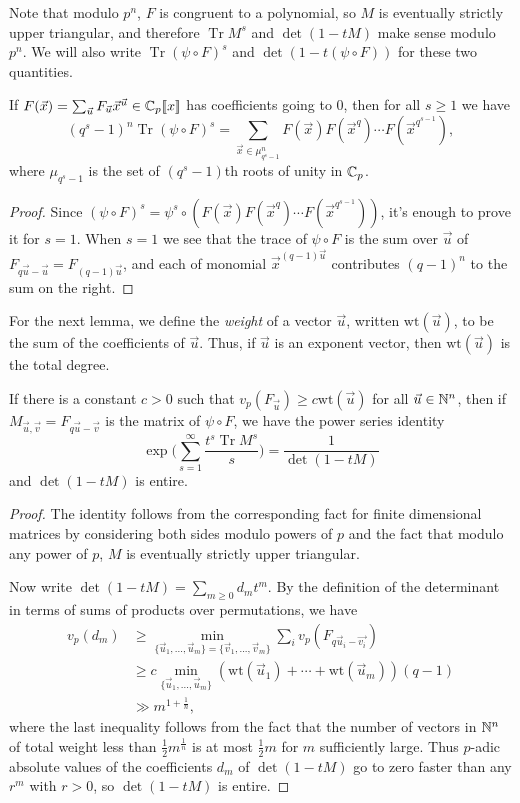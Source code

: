 \documentclass[letterpaper,11pt]{article}
\DeclareMathOperator{\Tr}{Tr}
\begin{document}
Note that modulo $p^n$, $F$ is congruent to a polynomial, so $M$ is eventually strictly upper triangular, and therefore $\Tr M^s$ and $\det(1-tM)$ make sense modulo $p^n$. We will also write $\Tr (\psi \circ F)^s$ and $\det(1-t(\psi\circ F))$ for these two quantities.

\begin{lem} If $F(\vec{x}) = \sum_{\vec{u}} F_{\vec{u}} \vec{x}^{\vec{u}} \in \mathbb{C}_p[\![x]\!]$ has coefficients going to $0$, then for all $s \ge 1$ we have
\[
(q^s-1)^n \Tr (\psi \circ F)^s = \sum_{\vec{x} \in \mu_{q^s-1}^n} F(\vec{x})F(\vec{x}^q) \cdots F(\vec{x}^{q^{s-1}}),
\]
where $\mu_{q^s-1}$ is the set of $(q^s-1)$th roots of unity in $\mathbb{C}_p$.
\end{lem}
\begin{proof} Since $(\psi\circ F)^s = \psi^s \circ (F(\vec{x})F(\vec{x}^q)\cdots F(\vec{x}^{q^{s-1}}))$, it's enough to prove it for $s = 1$. When $s = 1$ we see that the trace of $\psi\circ F$ is the sum over $\vec{u}$ of $F_{q\vec{u}-\vec{u}} = F_{(q-1)\vec{u}}$, and each of monomial $\vec{x}^{(q-1)\vec{u}}$ contributes $(q-1)^n$ to the sum on the right.
\end{proof}

For the next lemma, we define the \emph{weight} of a vector $\vec{u}$, written $\mbox{wt}(\vec{u})$, to be the sum of the coefficients of $\vec{u}$. Thus, if $\vec{u}$ is an exponent vector, then $\mbox{wt}(\vec{u})$ is the total degree.

\begin{lem} If there is a constant $c > 0$ such that $v_p(F_{\vec{u}}) \ge c\mbox{wt}(\vec{u})$ for all $\vec{u} \in \mathbb{N}^n$, then if $M_{\vec{u},\vec{v}} = F_{q\vec{u}-\vec{v}}$ is the matrix of $\psi\circ F$, we have the power series identity
\[
\exp\Bigg(\sum_{s=1}^{\infty} \frac{t^s\Tr M^s}{s}\Bigg) = \frac{1}{\det(1-tM)}
\]
and $\det(1-tM)$ is entire.
\end{lem}
\begin{proof} The identity follows from the corresponding fact for finite dimensional matrices by considering both sides modulo powers of $p$ and the fact that modulo any power of $p$, $M$ is eventually strictly upper triangular.

Now write $\det(1-tM) = \sum_{m\ge 0} d_mt^m$. By the definition of the determinant in terms of sums of products over permutations, we have
\begin{align*}
v_p(d_m) &\ge \min_{\{\vec{u}_1, ..., \vec{u}_m\} = \{\vec{v}_1, ..., \vec{v}_m\}} \sum_i v_p(F_{q\vec{u}_i-\vec{v_i}})\\
&\ge c\min_{\{\vec{u}_1, ..., \vec{u}_m\}} (\mbox{wt}(\vec{u}_1) + \cdots + \mbox{wt}(\vec{u}_m))(q-1)\\
&\gg m^{1+\tfrac{1}{n}},
\end{align*}
where the last inequality follows from the fact that the number of vectors in $\mathbb{N}^n$ of total weight less than $\frac{1}{2}m^{\frac{1}{n}}$ is at most $\frac{1}{2}m$ for $m$ sufficiently large. Thus $p$-adic absolute values of the coefficients $d_m$ of $\det(1-tM)$ go to zero faster than any $r^m$ with $r > 0$, so $\det(1-tM)$ is entire.
\end{proof}
\end{document}
